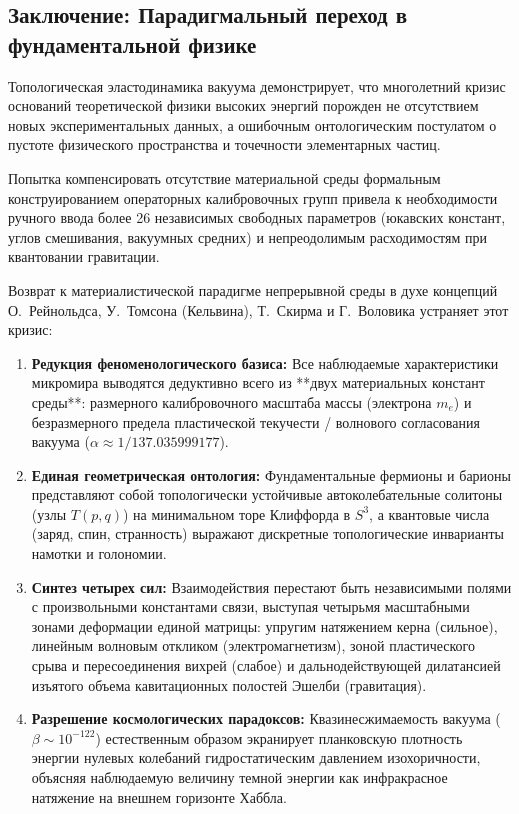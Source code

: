 \documentclass[11pt,a4paper]{article}
\theoremstyle{definition}
\theoremstyle{remark}
\begin{document}
\subsection{Заключение: Парадигмальный переход в фундаментальной физике}
Топологическая эластодинамика вакуума демонстрирует, что многолетний кризис оснований теоретической физики высоких энергий порожден не отсутствием новых экспериментальных данных, а ошибочным онтологическим постулатом о пустоте физического пространства и точечности элементарных частиц.

Попытка компенсировать отсутствие материальной среды формальным конструированием операторных калибровочных групп привела к необходимости ручного ввода более 26 независимых свободных параметров (юкавских констант, углов смешивания, вакуумных средних) и непреодолимым расходимостям при квантовании гравитации.

Возврат к материалистической парадигме непрерывной среды в духе концепций О.~Рейнольдса, У.~Томсона (Кельвина), Т.~Скирма и Г.~Воловика устраняет этот кризис:
\begin{enumerate}
    \item \textbf{Редукция феноменологического базиса:} Все наблюдаемые характеристики микромира выводятся дедуктивно всего из **двух материальных констант среды**: размерного калибровочного масштаба массы (электрона $m_e$) и безразмерного предела пластической текучести / волнового согласования вакуума ($\alpha \approx 1/137.035999177$).
    \item \textbf{Единая геометрическая онтология:} Фундаментальные фермионы и барионы представляют собой топологически устойчивые автоколебательные солитоны (узлы $T(p,q)$) на минимальном торе Клиффорда в $S^3$, а квантовые числа (заряд, спин, странность) выражают дискретные топологические инварианты намотки и голономии.
    \item \textbf{Синтез четырех сил:} Взаимодействия перестают быть независимыми полями с произвольными константами связи, выступая четырьмя масштабными зонами деформации единой матрицы: упругим натяжением керна (сильное), линейным волновым откликом (электромагнетизм), зоной пластического срыва и пересоединения вихрей (слабое) и дальнодействующей дилатансией изъятого объема кавитационных полостей Эшелби (гравитация).
    \item \textbf{Разрешение космологических парадоксов:} Квазинесжимаемость вакуума ($\beta \sim 10^{-122}$) естественным образом экранирует планковскую плотность энергии нулевых колебаний гидростатическим давлением изохоричности, объясняя наблюдаемую величину темной энергии как инфракрасное натяжение на внешнем горизонте Хаббла.
\end{enumerate}
\end{document}
